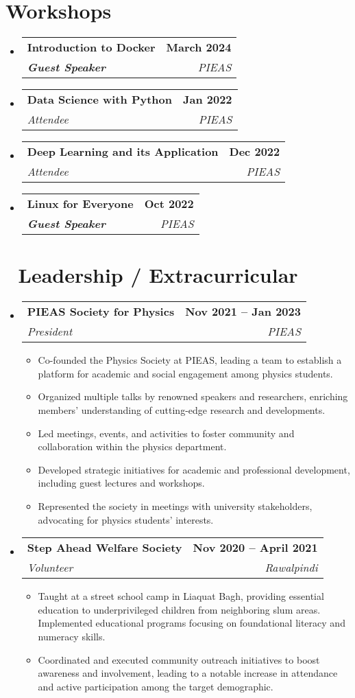 \documentclass[a4paper,11pt]{article}
\makeatletter
\newcommand{\resumeItem}[1]{
  \item\small{
    {#1 \vspace{-2pt}}
  }
}
\newcommand{\resumeSubheading}[4]{
  \vspace{-2pt}\item
    \begin{tabular*}{1.0\textwidth}[t]{l@{\extracolsep{\fill}}r}
      \textbf{\small #1} & \textbf{\small #2} \\
      \textit{\small#3} & \textit{\small #4} \\
    \end{tabular*}\vspace{-7pt}
}
\newcommand{\resumeSubHeadingListStart}{\begin{itemize}[leftmargin=0.0in, label={}]}
\newcommand{\resumeSubHeadingListEnd}{\end{itemize}}
\newcommand{\resumeItemListStart}{\begin{itemize}}
\newcommand{\resumeItemListEnd}{\end{itemize}\vspace{-5pt}}
\makeatother
\begin{document}
\vspace{-1mm}

 \endgroup


\section{{\faPaperPlane[regular] }  Workshops}


    \resumeSubHeadingListStart
        \resumeSubheading{Introduction to Docker}{March 2024}{\textbf{Guest Speaker}}{PIEAS}
          \vspace{-5pt}
        \resumeSubheading{Data Science with Python}{Jan 2022}{Attendee}{PIEAS}
          \vspace{-5pt}
        \resumeSubheading{Deep Learning and its Application}{Dec 2022}{Attendee}{PIEAS}
          \vspace{-5pt}
        \resumeSubheading{Linux for Everyone}{Oct 2022}{\textbf{Guest Speaker}}{PIEAS}

    \resumeSubHeadingListEnd

\section{{\FAS } Leadership / Extracurricular}
    \resumeSubHeadingListStart
        \resumeSubheading{PIEAS Society for Physics}{Nov 2021 -- Jan 2023}{President}{PIEAS}
            \resumeItemListStart
              \resumeItem{Co-founded the Physics Society at PIEAS, leading a team to establish a platform for academic and social engagement among physics students.}
              \resumeItem{Organized multiple talks by renowned speakers and researchers, enriching members' understanding of cutting-edge research and developments.}
              \resumeItem{Led meetings, events, and activities to foster community and collaboration within the physics department.}
              \resumeItem{Developed strategic initiatives for academic and professional development, including guest lectures and workshops.}
              \resumeItem{Represented the society in meetings with university stakeholders, advocating for physics students' interests.}
            \resumeItemListEnd


        \resumeSubheading{Step Ahead Welfare Society}{Nov 2020 -- April 2021}{Volunteer}{Rawalpindi}
            \resumeItemListStart
              \resumeItem{Taught at a street school camp in Liaquat Bagh, providing essential education to underprivileged children from neighboring slum areas. Implemented educational programs focusing on foundational literacy and numeracy skills.}
              \resumeItem{Coordinated and executed community outreach initiatives to boost awareness and involvement, leading to a notable increase in attendance and active participation among the target demographic.}
            \resumeItemListEnd

    \resumeSubHeadingListEnd
\end{document}
